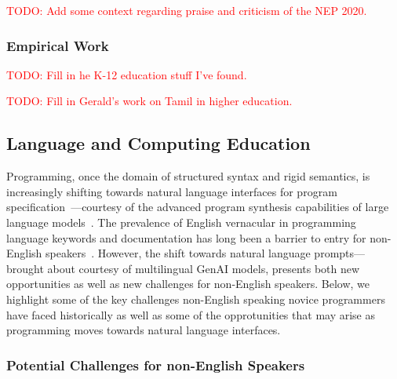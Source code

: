 \textcolor{red}{
  TODO: Add some context regarding praise and criticism of the NEP 2020.
  \blindtext[1]
}

\subsubsection{Empirical Work}\label{subsubsec:empirical-work}

\textcolor{red}{
  TODO: Fill in he K-12 education stuff I've found.
  \blindtext[1]
}

\textcolor{red}{
  TODO: Fill in Gerald's work on Tamil in higher education.
  \blindtext[1]
}


\subsection{Language and Computing Education}\label{subsec:language-and-computing-education}

Programming, once the domain of structured syntax and rigid semantics, is
increasingly shifting towards natural language interfaces for program
specification~\cite{lau2023ban, prather2025beyond, chen2025empirical,
petrovska2024incorporating}---courtesy of the advanced program synthesis
capabilities of large language models~\cite{austin2021program, jimenezswe}. The
prevalence of English vernacular in programming language keywords and
documentation has long been a barrier to entry for non-English
speakers~\cite{guo2018non}. However, the shift towards natural language
prompts---brought about courtesy of multilingual GenAI models, presents both
new opportunities as well as new challenges for non-English speakers. Below, we
highlight some of the key challenges non-English speaking novice programmers
have faced historically as well as some of the opprotunities that may arise as
programming moves towards natural language interfaces.

\subsubsection{Potential Challenges for non-English Speakers}



